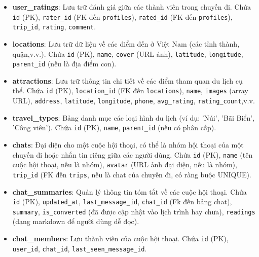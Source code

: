 \begin{itemize}
    \item \textbf{user\_ratings}: Lưu trữ đánh giá giữa các thành viên trong chuyến đi. Chứa \texttt{id} (PK), \texttt{rater\_id} (FK đến \texttt{profiles}), \texttt{rated\_id} (FK đến \texttt{profiles}), \texttt{trip\_id}, \texttt{rating}, \texttt{comment}.

    \item \textbf{locations}: Lưu trữ dữ liệu về các điểm đến ở Việt Nam (các tỉnh thành, quận,v.v.). Chứa \texttt{id} (PK), \texttt{name}, \texttt{cover} (URL ảnh), \texttt{latitude}, \texttt{longitude}, \texttt{parent\_id} (nếu là địa điểm con).

    \item \textbf{attractions}: Lưu trữ thông tin chi tiết về các điểm tham quan du lịch cụ thể. Chứa \texttt{id} (PK), \texttt{location\_id} (FK đến \texttt{locations}), \texttt{name}, \texttt{images} (array URL), \texttt{address}, \texttt{latitude}, \texttt{longitude}, \texttt{phone}, \texttt{avg\_rating}, \texttt{rating\_count},v.v.


    \item \textbf{travel\_types}: Bảng danh mục các loại hình du lịch (ví dụ: 'Núi', 'Bãi Biển', 'Công viên'). Chứa \texttt{id} (PK), \texttt{name}, \texttt{parent\_id} (nếu có phân cấp).

    \item \textbf{chats}: Đại diện cho một cuộc hội thoại, có thể là nhóm hội thoại của một chuyến đi hoặc nhắn tin riêng giữa các người dùng. Chứa \texttt{id} (PK), \texttt{name} (tên cuộc hội thoại, nếu là nhóm), \texttt{avatar} (URL ảnh đại diện, nếu là nhóm), \texttt{trip\_id} (FK đến \texttt{trips}, nếu là chat của chuyến đi, có ràng buộc UNIQUE).
    
    \item \textbf{chat\_summaries}: Quản lý thông tin tóm tắt về các cuộc hội thoại. Chứa \texttt{id} (PK), \texttt{updated\_at}, \texttt{last\_message\_id}, \texttt{chat\_id} (Fk đến bảng chat), \texttt{summary}, \texttt{is\_converted} (đã được cập nhật vào lịch trình hay chưa), \texttt{readings} (dạng markdown để người dùng dễ đọc).

    \item \textbf{chat\_members}: Lưu thành viên của cuộc hội thoại. Chứa \texttt{id} (PK), \texttt{user\_id}, \texttt{chat\_id}, \texttt{last\_seen\_message\_id}.


\end{itemize}
